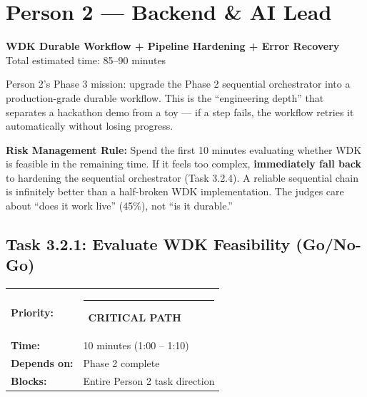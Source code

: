 \documentclass[11pt, a4paper]{article}
\newcommand{\critical}{\textcolor{critred}{\rule{6pt}{6pt}}~\textcolor{critred}{\scriptsize\textbf{CRITICAL PATH}}}
\begin{document}
\newpage

\section{Person 2 --- Backend \& AI Lead}
\begin{center}
\textcolor{medteal}{\large\textbf{WDK Durable Workflow + Pipeline Hardening + Error Recovery}}\\[2pt]
\textcolor{textmuted}{\small Total estimated time: 85--90 minutes}
\end{center}

\vspace{0.5em}

Person 2's Phase 3 mission: upgrade the Phase 2 sequential orchestrator into a production-grade durable workflow. This is the ``engineering depth'' that separates a hackathon demo from a toy --- if a step fails, the workflow retries it automatically without losing progress.

\begin{warningbox}
\textbf{Risk Management Rule:} Spend the first 10 minutes evaluating whether WDK is feasible in the remaining time. If it feels too complex, \textbf{immediately fall back} to hardening the sequential orchestrator (Task 3.2.4). A reliable sequential chain is infinitely better than a half-broken WDK implementation. The judges care about ``does it work live'' (45\%), not ``is it durable.''
\end{warningbox}

\vspace{0.5em}

\subsection{Task 3.2.1: Evaluate WDK Feasibility (Go/No-Go)}

\begin{tabularx}{\textwidth}{lX}
\textbf{Priority:} & \critical \\
\textbf{Time:} & 10 minutes (1:00 -- 1:10) \\
\textbf{Depends on:} & Phase 2 complete \\
\textbf{Blocks:} & Entire Person 2 task direction \\
\end{tabularx}

\vspace{0.3em}
\end{document}
